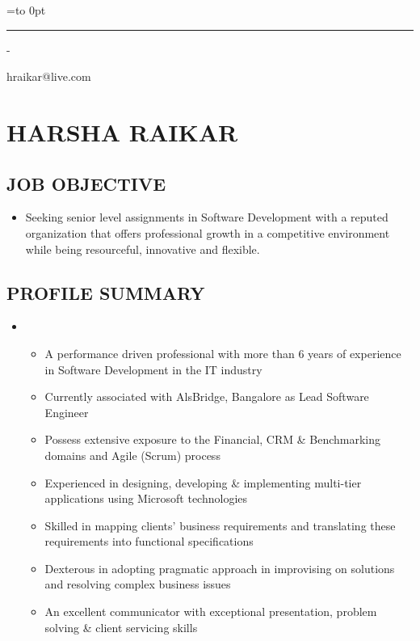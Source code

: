 \documentclass[]{article}
\author{}
\date{}
\newenvironment{nospace}
  {\par\edef\theprevdepth{\the\prevdepth}\nointerlineskip
   \setbox\zerobox=\vtop to 0pt\bgroup
   \hrule height0pt\kern\dimexpr\baselineskip-\topskip\relax
  }
  {\par\vss\egroup\ht\zerobox=0pt \wd\zerobox=0pt \dp\zerobox=0pt
   \box\zerobox}
\begin{document}
\begin{nospace}\begin{flushright}
hraikar@live.com
\end{flushright}\end{nospace}

\section{HARSHA RAIKAR}\label{harsha-raikar}

\subsection{JOB OBJECTIVE}\label{job-objective}

\begin{itemize}
\itemsep1pt\parskip0pt
\item
  Seeking senior level assignments in Software Development with a
  reputed organization that offers professional growth in a competitive
  environment while being resourceful, innovative and flexible.
\end{itemize}

\subsection{PROFILE SUMMARY}\label{profile-summary}

\begin{itemize}
\item
  \begin{itemize}
  \itemsep1pt\parskip0pt
  \item
    A performance driven professional with more than 6 years of
    experience in Software Development in the IT industry
  \item
    Currently associated with AlsBridge, Bangalore as Lead Software
    Engineer
  \item
    Possess extensive exposure to the Financial, CRM \& Benchmarking
    domains and Agile (Scrum) process
  \item
    Experienced in designing, developing \& implementing multi-tier
    applications using Microsoft technologies
  \item
    Skilled in mapping clients' business requirements and translating
    these requirements into functional specifications
  \item
    Dexterous in adopting pragmatic approach in improvising on solutions
    and resolving complex business issues
  \item
    An excellent communicator with exceptional presentation, problem
    solving \& client servicing skills
  \end{itemize}
\end{itemize}
\end{document}
